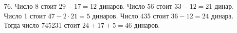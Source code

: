 76. Число 8 стоит $29-17=12$ динаров. Число 56 стоит $33-12=21$ динар. Число 1 стоит $47-2\cdot21=5$ динаров. Число 435 стоит $36-12=24$ динара. Тогда число 745231 стоит $24+17+5=46$ динаров.\\
